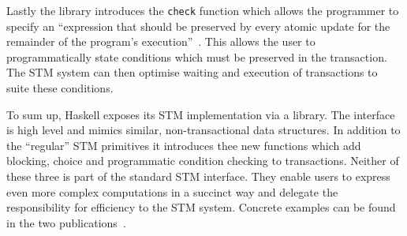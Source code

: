 Lastly the library introduces the \texttt{check} function which allows the
programmer to specify an ``expression that should be preserved by every atomic
update for the remainder of the program’s
execution''~\cite[abstract]{transactional-memory-data-invariants}. This allows the
user to programmatically state conditions which must be preserved in the
transaction. The STM system can then optimise waiting and execution of
transactions to suite these conditions.

To sum up, Haskell exposes its STM implementation via a library. The interface
is high level and mimics similar, non-transactional data structures. In addition
to the ``regular'' STM primitives it introduces thee new functions which add
blocking, choice and programmatic condition checking to transactions. Neither of
these three is part of the standard STM interface. They enable users to express
even more complex computations in a succinct way and delegate the responsibility
for efficiency to the STM system. Concrete examples can be found in the two
publications~\cite{composable-transactions,transactional-memory-data-invariants}.
